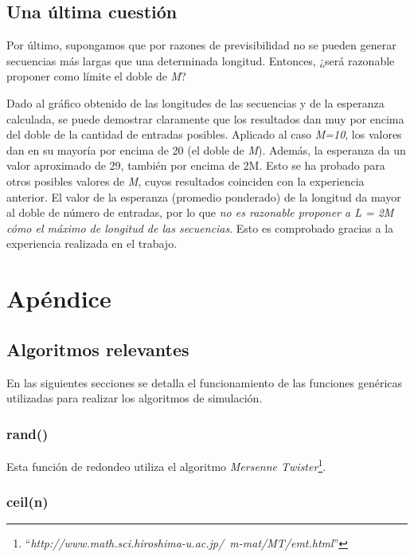 \documentclass{article}
\begin{document}
\subsection{Una última cuestión}

Por último, supongamos que por razones de previsibilidad no se pueden generar secuencias más largas que una determinada longitud. Entonces, ¿será razonable proponer como límite el doble de \textit{M}?
	\par
	Dado al gráfico obtenido de las longitudes de las secuencias y de la esperanza calculada, se puede demostrar claramente que los resultados dan muy por encima del doble de la cantidad de entradas posibles. Aplicado al caso \textit{M=10}, los valores dan en su mayoría por encima de 20 (el doble de \textit{M}). Además, la esperanza da un valor aproximado de 29, también por encima de 2M. Esto se ha probado para otros posibles valores de \textit{M}, cuyos resultados coinciden con la experiencia anterior. El valor de la esperanza (promedio ponderado) de la longitud da mayor al doble de número de entradas, por lo que \textit{no es razonable proponer a L = 2M cómo el máximo de longitud de las secuencias}. Esto es comprobado gracias a la experiencia realizada en el trabajo.




\section{Apéndice}


\subsection{Algoritmos relevantes}

En las siguientes secciones se detalla el funcionamiento de las funciones genéricas utilizadas para realizar los algoritmos de simulación.


\subsubsection{rand()}

Esta función de redondeo utiliza el algoritmo \textit{Mersenne Twister}\footnote{``\textit{http://www.math.sci.hiroshima-u.ac.jp/~m-mat/MT/emt.html}''}.


\subsubsection{ceil(n)}
\end{document}
